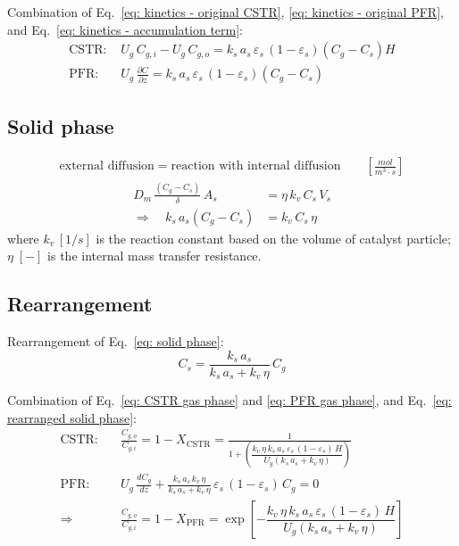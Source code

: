 Combination of Eq.~\eqref{eq: kinetics - original CSTR}, \eqref{eq: kinetics - original PFR}, and Eq.~\eqref{eq: kinetics - accumulation term}: 
\begin{align}
    \text{CSTR: }
    & U_g\, C_{g,i} - U_g\, C_{g,o} 
    = k_s \, a_s \, \varepsilon_s \,(1-\varepsilon_s) (C_g - C_s) H 
    \label{eq: CSTR gas phase} \\ 
    \text{PFR: }
    & U_g\,\frac{\partial C}{\partial z}
    = k_s \, a_s \, \varepsilon_s \,(1-\varepsilon_s) (C_g - C_s) 
    \label{eq: PFR gas phase}
\end{align}

\subsection{Solid phase}
\begin{align*}
    \text{external diffusion}
    = 
    \text{reaction with internal diffusion}
    \qquad \left[\si{\frac{mol}{m^3\cdot s}}\right]
\end{align*}
\begin{align}
    D_m\, \frac{(C_g - C_s)}{\delta}\, A_s
    &= \eta \, k_v \, C_s \, V_s \\
    \Longrightarrow \quad 
    k_s \, a_s (C_g - C_s) 
    &= k_v \, C_s \, \eta 
    \label{eq: solid phase}
\end{align}
where $k_v\, [\si{1/s}]$ is the reaction constant based on the volume of catalyst particle; $\eta\; [-]$ is the internal mass transfer resistance.

\subsection{Rearrangement}
Rearrangement of Eq.~\eqref{eq: solid phase}:
\begin{equation}
    C_s = \frac{k_s\, a_s}{k_s\, a_s + k_v\,\eta}\, C_g
    \label{eq: rearranged solid phase}
\end{equation}

Combination of Eq.~\eqref{eq: CSTR gas phase} and \eqref{eq: PFR gas phase}, and Eq.~\eqref{eq: rearranged solid phase}:
\begin{align}
    \text{CSTR:} \quad
    & \frac{C_{g,o}}{C_{g,i}} = 1- X_\text{CSTR}
    = \frac{1}{1+ \left(
        \dfrac{k_v\,\eta\,k_s\,a_s\,\varepsilon_s\,(1-\varepsilon_s)\,H}{U_g(k_s\, a_s + k_v\,\eta)}
        \right)} 
    \label{eq: CSTR in fixed bed}\\
    \text{PFR:} \quad
    & U_g\,\frac{dC_{g}}{dz} + \frac{k_s\,a_s\,k_v\,\eta}{k_s\,a_s + k_v\,\eta}\,\varepsilon_s\,(1-\varepsilon_s)\,C_g = 0 \\
    \Longrightarrow \quad 
    & \frac{C_{g,o}}{C_{g,i}} = 1- X_\text{PFR}
    = \exp \left[
        - \dfrac{k_v\,\eta\,k_s\,a_s\,\varepsilon_s\,(1-\varepsilon_s)\,H}{U_g(k_s\, a_s + k_v\,\eta)}  
    \right]
    \label{eq: PFR in fixed bed}
\end{align}

